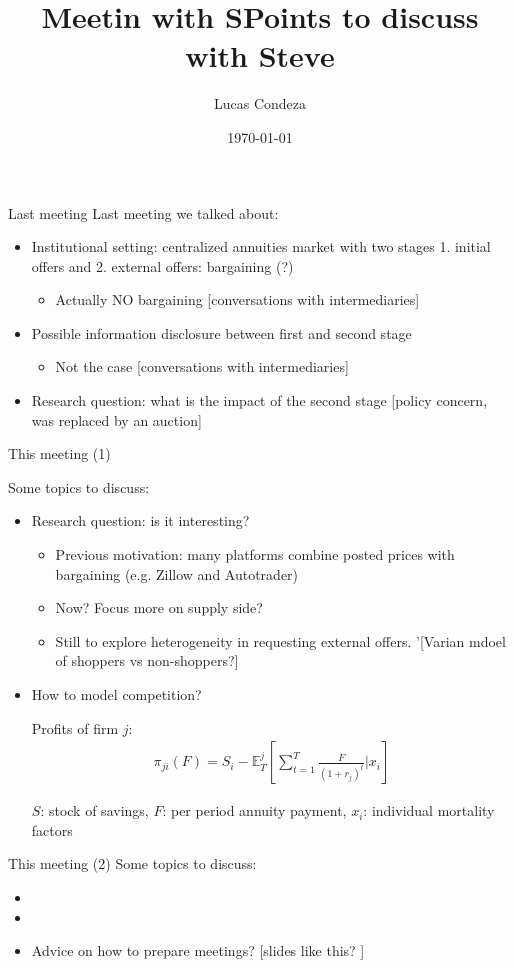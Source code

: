 \documentclass[10pt,aspectratio=169]{beamer}
\title{Meetin with SPoints to discuss with Steve}
\author{%
 Lucas Condeza
\inst{1} \and
}
\institute{
  \inst{1} Yale University \\
}
\date{\today}
\begin{document}



\begin{frame}{Last meeting}
Last meeting we talked about:
\begin{itemize}
    \item Institutional setting: centralized annuities market with two stages 1. initial offers and 2. external offers: bargaining (?)  
    \begin{itemize}
        \item Actually NO bargaining [conversations with intermediaries]
    \end{itemize}
    \item Possible information disclosure between first and second stage 
    \begin{itemize}
        \item Not the case [conversations with intermediaries]
    \end{itemize}
    \item Research question: what is the impact of the second stage [policy concern, was replaced by an auction]
\end{itemize}
\end{frame}


\begin{frame}{This meeting (1)}

Some topics to discuss: 
\begin{itemize}
    \item Research question: is it interesting? 

    \begin{itemize}
        \item Previous motivation: many platforms combine posted prices with bargaining (e.g. Zillow and Autotrader)
        \item Now? Focus more on supply side? 
        \item Still to explore heterogeneity in requesting external offers. '[Varian mdoel of shoppers vs non-shoppers?]
    \end{itemize}

    \item How to model competition? 

    
    Profits of firm $j$: 
    \begin{align*}
    \pi_{ji}(F) = S_i-  \mathbb{E}^j_{T} \left[\sum_{t=1}^T\frac{F}{(1+r_j)^t}|x_i \right]
    \end{align*}
 

     $S$: stock of savings, $F$: per period annuity payment, $x_i$: individual mortality factors 
\end{itemize}
\end{frame}



\begin{frame}{This meeting (2)}
Some topics to discuss: 
\begin{itemize}
    \item  
    \item 
    \item Advice on how to prepare meetings? [slides like this? ]
\end{itemize}
\end{frame}
\end{document}
